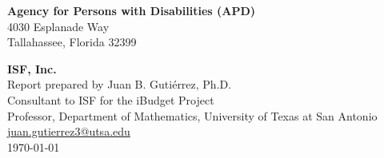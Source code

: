 \begin{flushleft}

\phantom{ghost text}

\vspace{\fill}

\noindent \textbf{Agency for Persons with Disabilities (APD)} \\
4030 Esplanade Way \\
Tallahassee, Florida 32399

\vspace{1cm}
\noindent \textbf{ISF, Inc.} \\
Report prepared by Juan B. Gutiérrez, Ph.D.\\
Consultant to ISF for the iBudget Project\\
Professor, Department of  Mathematics, University of Texas at San Antonio\\
\href{mailto:juan.gutierrez3@utsa.edu}{juan.gutierrez3@utsa.edu}\\
\today
\end{flushleft}





\tableofcontents

\newpage


